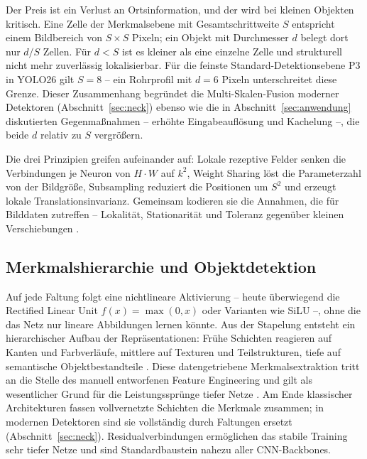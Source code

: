 Der Preis ist ein Verlust an Ortsinformation, und der wird bei kleinen Objekten
kritisch. Eine Zelle der Merkmalsebene mit Gesamtschrittweite $S$ entspricht
einem Bildbereich von $S \times S$ Pixeln; ein Objekt mit Durchmesser $d$ belegt
dort nur $d/S$ Zellen. Für $d < S$ ist es kleiner als eine einzelne Zelle und
strukturell nicht mehr zuverlässig lokalisierbar. Für die feinste
Standard-Detektionsebene P3 in YOLO26 gilt $S = 8$ -- ein Rohrprofil mit
$d = 6$ Pixeln unterschreitet diese Grenze. Dieser Zusammenhang begründet die
Multi-Skalen-Fusion moderner Detektoren (Abschnitt~\ref{sec:neck}) ebenso wie die
in Abschnitt~\ref{sec:anwendung} diskutierten Gegenmaßnahmen -- erhöhte
Eingabeauflösung und Kachelung --, die beide $d$ relativ zu $S$ vergrößern.

 Die drei Prinzipien greifen aufeinander auf: Lokale
rezeptive Felder senken die Verbindungen je Neuron von $H \cdot W$ auf $k^2$,
Weight Sharing löst die Parameterzahl von der Bildgröße, Subsampling reduziert
die Positionen um $S^2$ und erzeugt lokale Translationsinvarianz. Gemeinsam
kodieren sie die Annahmen, die für Bilddaten zutreffen -- Lokalität,
Stationarität und Toleranz gegenüber kleinen Verschiebungen
\parencite{lecun1998}.

\subsection{Merkmalshierarchie und Objektdetektion}
\label{sec:hierarchie}

Auf jede Faltung folgt eine nichtlineare Aktivierung -- heute überwiegend die
Rectified Linear Unit $f(x) = \max(0,x)$ oder Varianten wie SiLU
\parencite{krizhevsky2012} --, ohne die das Netz nur lineare Abbildungen lernen
könnte. Aus der Stapelung entsteht ein hierarchischer Aufbau der
Repräsentationen: Frühe Schichten reagieren auf Kanten und Farbverläufe, mittlere
auf Texturen und Teilstrukturen, tiefe auf semantische Objektbestandteile
\parencite{zeiler2014}. Diese datengetriebene Merkmalsextraktion tritt an die
Stelle des manuell entworfenen Feature Engineering und gilt als wesentlicher
Grund für die Leistungssprünge tiefer Netze \parencite{lecun2015}. Am Ende
klassischer Architekturen fassen vollvernetzte Schichten die Merkmale zusammen;
in modernen Detektoren sind sie vollständig durch Faltungen ersetzt
(Abschnitt~\ref{sec:neck}). Residualverbindungen \parencite{he2016} ermöglichen
das stabile Training sehr tiefer Netze und sind Standardbaustein nahezu aller
CNN-Backbones.

